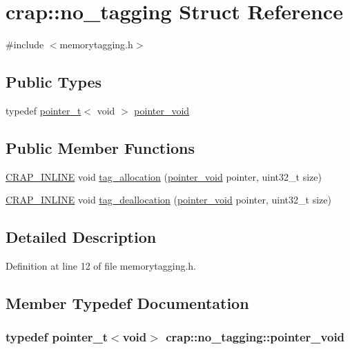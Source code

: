 \hypertarget{structcrap_1_1no__tagging}{\section{crap\+:\+:no\+\_\+tagging Struct Reference}
\label{structcrap_1_1no__tagging}
}


{\ttfamily \#include $<$memorytagging.\+h$>$}

\subsection*{Public Types}
\begin{DoxyCompactItemize}
\item 
typedef \hyperlink{structcrap_1_1pointer__t}{pointer\+\_\+t}$<$ void $>$ \hyperlink{structcrap_1_1no__tagging_ad6207e0a8c15892cc0263e77e0e0add6}{pointer\+\_\+void}
\end{DoxyCompactItemize}
\subsection*{Public Member Functions}
\begin{DoxyCompactItemize}
\item 
\hyperlink{config__x86_8h_a5a40526b8d842e7ff731509998bb0f1c}{C\+R\+A\+P\+\_\+\+I\+N\+L\+I\+N\+E} void \hyperlink{structcrap_1_1no__tagging_abcce3996166dd8c007c0dd3fbbcce05d}{tag\+\_\+allocation} (\hyperlink{structcrap_1_1no__tagging_ad6207e0a8c15892cc0263e77e0e0add6}{pointer\+\_\+void} pointer, uint32\+\_\+t size)
\item 
\hyperlink{config__x86_8h_a5a40526b8d842e7ff731509998bb0f1c}{C\+R\+A\+P\+\_\+\+I\+N\+L\+I\+N\+E} void \hyperlink{structcrap_1_1no__tagging_a956afc0ce49ae5213a93e6a52e4abc92}{tag\+\_\+deallocation} (\hyperlink{structcrap_1_1no__tagging_ad6207e0a8c15892cc0263e77e0e0add6}{pointer\+\_\+void} pointer, uint32\+\_\+t size)
\end{DoxyCompactItemize}


\subsection{Detailed Description}


Definition at line 12 of file memorytagging.\+h.



\subsection{Member Typedef Documentation}
\hypertarget{structcrap_1_1no__tagging_ad6207e0a8c15892cc0263e77e0e0add6}{
\subsubsection[{pointer\+\_\+void}]{\setlength{\rightskip}{0pt plus 5cm}typedef {\bf pointer\+\_\+t}$<$void$>$ {\bf crap\+::no\+\_\+tagging\+::pointer\+\_\+void}}}\label{structcrap_1_1no__tagging_ad6207e0a8c15892cc0263e77e0e0add6}


